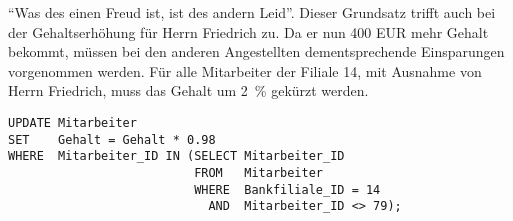           \enquote{Was des einen Freud ist, ist des andern Leid}. Dieser
          Grundsatz trifft auch bei der Gehaltserh\"ohung f\"ur Herrn Friedrich
          zu. Da er nun 400 EUR mehr Gehalt bekommt, m\"ussen bei den anderen
          Angestellten dementsprechende Einsparungen vorgenommen  werden. F\"ur
          alle Mitarbeiter der Filiale 14, mit Ausnahme von Herrn Friedrich,
          muss das Gehalt um 2~\% gek\"urzt werden.
          \begin{lstlisting}[language=oracle_sql,caption={Gehaltsk\"urzung f\"ur eine ganze Filiale},label=sql07_18]
UPDATE Mitarbeiter
SET    Gehalt = Gehalt * 0.98
WHERE  Mitarbeiter_ID IN (SELECT Mitarbeiter_ID
                          FROM   Mitarbeiter
                          WHERE  Bankfiliale_ID = 14
                            AND  Mitarbeiter_ID <> 79);
          \end{lstlisting}
